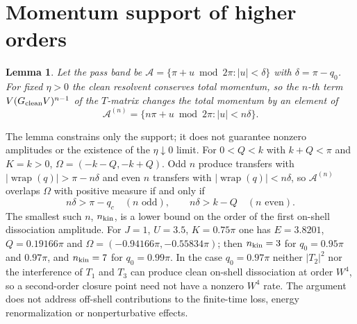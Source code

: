 \documentclass[12pt,a4paper]{article}
\newtheorem{lemma}{Lemma}
\theoremstyle{remark}
\newcommand{\wrap}{\operatorname{wrap}}
\begin{document}
\section{Momentum support of higher orders}\label{app:higher}

\begin{lemma}\label{lem:support}
Let the pass band be $\mathcal{A}=\{\pi+u \bmod 2\pi:|u|<\delta\}$ with $\delta=\pi-q_0$. For fixed $\eta>0$ the clean resolvent conserves total momentum, so the $n$-th term $V(G_{\rm clean}V)^{n-1}$ of the $T$-matrix changes the total momentum by an element of
\begin{equation}
\mathcal{A}^{(n)}=\{n\pi+u\bmod2\pi:|u|<n\delta\}.
\end{equation}
\end{lemma}

The lemma constrains only the support; it does not guarantee nonzero amplitudes or the existence of the $\eta\downarrow0$ limit. For $0<Q<k$ with $k+Q<\pi$ and $K=k>0$, $\Omega=(-k-Q,-k+Q)$. Odd $n$ produce transfers with $|\wrap(q)|>\pi-n\delta$ and even $n$ transfers with $|\wrap(q)|<n\delta$, so $\mathcal{A}^{(n)}$ overlaps $\Omega$ with positive measure if and only if
\begin{equation}
n\delta>\pi-q_c\quad(n\text{ odd}),\qquad n\delta>k-Q\quad(n\text{ even}).
\end{equation}
The smallest such $n$, $n_{\rm kin}$, is a lower bound on the order of the first on-shell dissociation amplitude. For $J=1$, $U=3.5$, $K=0.75\pi$ one has $E=3.8201$, $Q=0.19166\pi$ and $\Omega=(-0.94166\pi,-0.55834\pi)$; then $n_{\rm kin}=3$ for $q_0=0.95\pi$ and $0.97\pi$, and $n_{\rm kin}=7$ for $q_0=0.99\pi$. In the case $q_0=0.97\pi$ neither $|T_2|^2$ nor the interference of $T_1$ and $T_3$ can produce clean on-shell dissociation at order $W^4$, so a second-order closure point need not have a nonzero $W^4$ rate. The argument does not address off-shell contributions to the finite-time loss, energy renormalization or nonperturbative effects.

\begingroup
\raggedright


\endgroup
\end{document}
